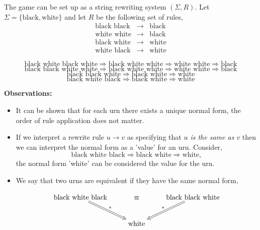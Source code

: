 \documentclass[a4paper,blends,pdf,colorBG,slideColor]{prosper}
\begin{document}
\vspace{.1in}
The game can be set up as a string rewriting system $(\Sigma,R)$.
 Let $\Sigma = \{ \mbox{black}, \mbox{white} \}$ and let $R$ be the following set of rules,
\[
\begin{array}{rcl}
\mbox{black black} &\rightarrow& \mbox{black}\\
\mbox{white white} &\rightarrow& \mbox{black}\\
\mbox{black white} &\rightarrow& \mbox{white}\\
\mbox{white black} &\rightarrow& \mbox{white}
\end{array}
\]

{\scriptsize
\[
\mbox{black white black white} \Rightarrow \mbox{black white white} \Rightarrow \mbox{white white} \Rightarrow \mbox{black}
\]
\[
\mbox{black black white white} \Rightarrow \mbox{black white white} \Rightarrow \mbox{white white} \Rightarrow \mbox{black}
\]
\[
\mbox{black black white} \Rightarrow \mbox{black white} \Rightarrow \mbox{white}
\]
\[
\mbox{black white black} \Rightarrow \mbox{black white} \Rightarrow \mbox{white}
\]
}
\es



\small
{\bf Observations:} 
\begin{itemize}
\item It can be shown that for each urn there exists a unique normal form, the order of rule application does not 
matter.
\item If we interpret a rewrite rule $u \rightarrow v$ as specifying that {\em $u$ is the same as $v$} then we can 
interpret the normal form as a 'value' for an urn. Consider,
\[
\mbox{black white black} \Rightarrow \mbox{black white} \Rightarrow \mbox{white},
\]
the normal form 'white' can be considered the value for the urn.
\item We say that two urns are equivalent if they have the same normal form,

{\scriptsize
\[
\xymatrix{
\mbox{black white black} \ar@{=>}[rd]^{*} &\equiv &\mbox{black black white}\ar@{=>}[ld]_{*}  \\
&\mbox{white}&
}
\]
}
\end{itemize}
\es

\end{document}
